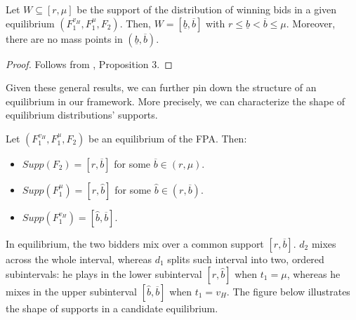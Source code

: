 \begin{lem}\label{lem:interval}
Let $ W \subseteq [r, \mu] $ be the support of the distribution of winning bids in a given equilibrium $ \left(F_1^{v_H}, F_1^{\mu}, F_2\right) $. Then, $ W = [\underline b, \overline{b}] $ with $ r \leq \underline{b} < \overline {b} \leq \mu $. Moreover, there are no mass points in $ (\underline b, \overline b) $.
\end{lem}
\begin{proof}
    Follows from \textcite{maskinEquilibriumSealedHigh2000}, Proposition 3.
\end{proof}

\noindent Given these general results, we can further pin down the structure of an equilibrium in our framework. More precisely, we can characterize the shape of equilibrium distributions' supports.

\begin{prop}\label{prop:eqm-supports}
Let $ \left(F_1^{v_H}, F_1^{\mu}, F_2 \right) $ be an equilibrium of the FPA. Then:

\begin{itemize}
    \item[-] $ Supp(F_2) = [r, \overline b] $ for some $ \overline{b} \in (r, \mu) $.

    

    \item[-] $ Supp\left(F_1^{\mu}\right) = [r, \hat{b}] $ for some $ \hat{b} \in (r, \overline b) $.

    

    \item[-] $ Supp\left(F_1^{v_H}\right) = [\hat{b}, \overline{b}] $.
\end{itemize}
\end{prop}

\noindent In equilibrium, the two bidders mix over a common support $ [r, \overline b] $. $ d_2 $ mixes across the whole interval, whereas $ d_1 $ splits such interval into two, ordered subintervals: he plays in the lower subinterval $ [r, \hat{b}] $ when $ t_1 = \mu $, whereas he mixes in the upper subinterval $ [\hat{b}, \overline{b}] $ when $ t_1 = v_H $. The figure below illustrates the shape of supports in a candidate equilibrium.

